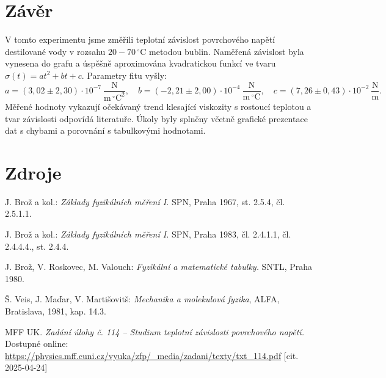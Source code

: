 \documentclass{prepareprotokol} %
\begin{document}
\section{Závěr}

V tomto experimentu jsme změřili teplotní závislost povrchového napětí destilované vody v rozsahu $20{-}70\,^\circ\mathrm{C}$ metodou bublin. Naměřená závislost byla vynesena do grafu a úspěšně aproximována kvadratickou funkcí ve tvaru $\sigma(t) = at^2 + bt + c$. Parametry fitu vyšly: 
\[
a = (3{,}02 \pm 2{,}30) \cdot 10^{-7}\ \mathrm{\frac{N}{m\,^\circ C^2}},\quad
b = (-2{,}21 \pm 2{,}00) \cdot 10^{-4}\ \mathrm{\frac{N}{m\,^\circ C}},\quad
c = (7{,}26 \pm 0{,}43) \cdot 10^{-2}\ \mathrm{\frac{N}{m}}.
\]
Měřené hodnoty vykazují očekávaný trend klesající viskozity s rostoucí teplotou a tvar závislosti odpovídá literatuře. Úkoly byly splněny včetně grafické prezentace dat s chybami a porovnání s tabulkovými hodnotami.


\vspace{1000px}


\section{Zdroje}

\begin{thebibliography}{9}
J. Brož a kol.: \textit{Základy fyzikálních měření I.} SPN, Praha 1967, st. 2.5.4, čl. 2.5.1.1.

J. Brož a kol.: \textit{Základy fyzikálních měření I.} SPN, Praha 1983, čl. 2.4.1.1, čl. 2.4.4.4., st. 2.4.4.

J. Brož, V. Roskovec, M. Valouch: \textit{Fyzikální a matematické tabulky.} SNTL, Praha 1980.

Š. Veis, J. Maďar, V. Martišovitš: \textit{Mechanika a molekulová fyzika}, ALFA, Bratislava, 1981, kap. 14.3.

MFF UK. \textit{Zadání úlohy č. 114 – Studium teplotní závislosti povrchového napětí.} Dostupné online:  
\url{https://physics.mff.cuni.cz/vyuka/zfp/_media/zadani/texty/txt_114.pdf} [cit. 2025-04-24]
\end{thebibliography}
\end{document}
